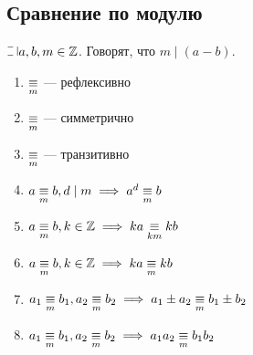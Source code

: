\begin{normalsize}
\section {Сравнение по модулю}

\begin{defn}
    $\letus a, b, m \in \mathZ$. Говорят, что $m \mid (a - b)$.
\end{defn}

\begin{prop}
    \begin{enumerate}
        \item $\underset{m}{\equiv}$ --- рефлексивно
        \item $\underset{m}{\equiv}$ --- симметрично
        \item $\underset{m}{\equiv}$ --- транзитивно
        \item $a \underset{m}{\equiv} b, d \mid m \implies a^d \underset{m}{\equiv} b$
        \item $a \underset{m}{\equiv} b, k \in \mathbb{Z} \implies ka \underset{km}{\equiv} kb$
        \item $a \underset{m}{\equiv} b, k \in \mathbb{Z} \implies ka \underset{m}{\equiv} kb$
        \item $a_1 \underset{m}{\equiv} b_1, a_2 \underset{m}{\equiv} b_2 \implies a_1 \pm a_2 \underset{m}{\equiv} b_1 \pm b_2$
        \item $a_1 \underset{m}{\equiv} b_1, a_2 \underset{m}{\equiv} b_2 \implies a_1 a_2 \underset{m}{\equiv} b_1 b_2$
    \end{enumerate}
\end{prop}

\end{normalsize}